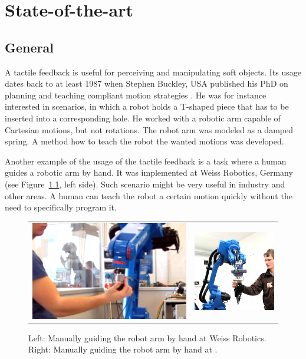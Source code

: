 \graphicspath{{Img/SOTA/}}

\chapter{State-of-the-art}

    \section{General}
A tactile feedback is useful for perceiving and manipulating soft objects. Its usage dates back to at least 1987 when Stephen Buckley, USA published his PhD on planning and teaching compliant motion strategies \cite{Buckley1987Insertion}. He was for instance interested in scenarios, in which a robot holds a T-shaped piece that has to be inserted into a corresponding hole. He worked with a robotic arm capable of Cartesian motions, but not rotations. The robot arm was modeled as a damped spring. A method how to teach the robot the wanted motions was developed.

Another example of the usage of the tactile feedback is a task where a human guides a robotic arm by hand. It was implemented at Weiss Robotics, Germany \cite{Weissrobotics} (see Figure~\ref{fig:CompliantMotion}, left side). Such scenario might be very useful in industry and other areas. A human can teach the robot a certain motion quickly without the need to specifically program it.

        \begin{figure}[h]
            \centering
            \begin{tabular}{cc}
            \includegraphics[height=0.3\textwidth]{WeissRobotics.png}
            &
            \includegraphics[height=0.3\textwidth]{CompliantMotion.png}
            \end{tabular}
            \caption{Left: Manually guiding the robot arm by hand at Weiss Robotics. Right: Manually guiding the robot arm by hand at \CloPeMa\/.}
            \label{fig:CompliantMotion}
        \end{figure}

